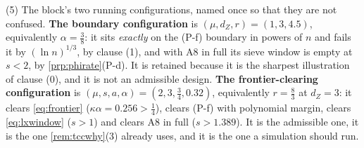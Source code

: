 \begin{remark}
(5) The block's two running configurations, named once so that they are not confused.
\textbf{The boundary configuration} is $(\mu,d_Z,r)=(1,3,4.5)$, equivalently $\alpha=\tfrac38$: it sits
\emph{exactly} on the (P-f) boundary in powers of $n$ and fails it by $(\ln n)^{1/3}$, by clause (1),
and with A8 in full its sieve window is empty at $s<2$, by \cref{prp:phirate}(P-d). It is
retained because it is the sharpest illustration of clause (0), and it is not an admissible design.
\textbf{The frontier-clearing configuration} is $(\mu,s,a,\alpha)=(2,3,\tfrac34,0.32)$, equivalently
$r=\tfrac83$ at $d_Z=3$: it clears \eqref{eq:frontier} ($\kappa\alpha=0.256>\tfrac14$), clears (P-f)
with polynomial margin, clears \eqref{eq:lxwindow} ($s>1$) and clears A8 in full ($s>1.389$).
It is the admissible one, it is the one \cref{rem:tccwhy}(3) already uses, and it is the one a
simulation should run.
\end{remark}


